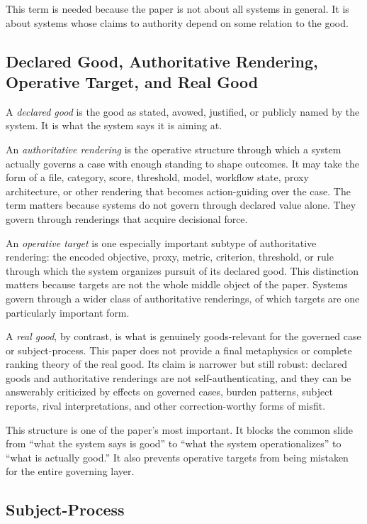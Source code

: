 \documentclass[11pt]{article}
\renewcommand{\emph}[1]{\textit{#1}}
\begin{document}
This term is needed because the paper is not about all systems in general. It is about systems whose claims to authority depend on some relation to the good.

\subsection{Declared Good, Authoritative Rendering, Operative Target, and Real Good}

A \emph{declared good} is the good as stated, avowed, justified, or publicly named by the system. It is what the system says it is aiming at.

An \emph{authoritative rendering} is the operative structure through which a system actually governs a case with enough standing to shape outcomes. It may take the form of a file, category, score, threshold, model, workflow state, proxy architecture, or other rendering that becomes action-guiding over the case. The term matters because systems do not govern through declared value alone. They govern through renderings that acquire decisional force.

An \emph{operative target} is one especially important subtype of authoritative rendering: the encoded objective, proxy, metric, criterion, threshold, or rule through which the system organizes pursuit of its declared good. This distinction matters because targets are not the whole middle object of the paper. Systems govern through a wider class of authoritative renderings, of which targets are one particularly important form.

A \emph{real good}, by contrast, is what is genuinely goods-relevant for the governed case or subject-process. This paper does not provide a final metaphysics or complete ranking theory of the real good. Its claim is narrower but still robust: declared goods and authoritative renderings are not self-authenticating, and they can be answerably criticized by effects on governed cases, burden patterns, subject reports, rival interpretations, and other correction-worthy forms of misfit.\cite{Campbell1979AssessingImpactPlannedSocialChange,ManheimGarrabrant2019GoodhartsLaw}

This structure is one of the paper's most important. It blocks the common slide from ``what the system says is good'' to ``what the system operationalizes'' to ``what is actually good.'' It also prevents operative targets from being mistaken for the entire governing layer.

\subsection{Subject-Process}
\end{document}
